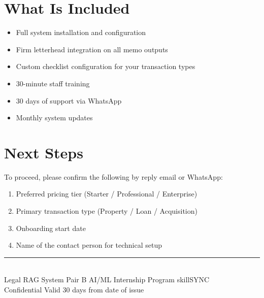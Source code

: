 \documentclass[12pt, a4paper]{article}
\begin{document}
\section{What Is Included}

\begin{itemize}
  \item Full system installation and configuration
  \item Firm letterhead integration on all memo outputs
  \item Custom checklist configuration for your transaction types
  \item 30-minute staff training
  \item 30 days of support via WhatsApp
  \item Monthly system updates
\end{itemize}

\section{Next Steps}

To proceed, please confirm the following by reply email or WhatsApp:

\begin{enumerate}
  \item Preferred pricing tier (Starter / Professional / Enterprise)
  \item Primary transaction type (Property / Loan / Acquisition)
  \item Onboarding start date
  \item Name of the contact person for technical setup
\end{enumerate}

\vspace{1cm}
\begin{center}
  {\color{primary}\rule{0.5\textwidth}{0.5pt}}\\[0.3cm]
  {\small\color{darkgray}
  Legal RAG System \textperiodcentered{}
  Pair B \textperiodcentered{}
  AI/ML Internship Program \textperiodcentered{}
  skillSYNC}\\[0.15cm]
  {\small\color{darkgray} Confidential \textperiodcentered{}
  Valid 30 days from date of issue}
\end{center}
\end{document}

